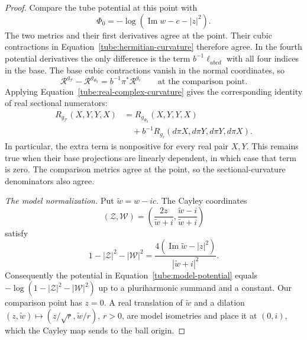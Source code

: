 \begin{proof}
Compare the tube potential at this point with
\begin{equation}\label{tube:model-potential}
 \Phi_0=-\log(\operatorname{Im}w-c-|z|^2).
\end{equation}
The two metrics and their first derivatives agree at the point.
Their cubic contractions in
Equation~\eqref{tube:hermitian-curvature} therefore agree.  In the
fourth potential derivatives the only difference is the term
$b^{-1}\ell_{a\bar b c\bar d}$ with all four indices in the base.
The base cubic contractions vanish in the normal coordinates, so
\begin{equation}\label{tube:hermitian-transfer}
 \mathcal R^{g_{\mathcal T}}-\mathcal R^{g_{\Phi_0}}
 =b^{-1}\pi^*\mathcal R^{g_\ell}
 \qquad\text{at the comparison point}.
\end{equation}
Applying Equation~\eqref{tube:real-complex-curvature} gives the
corresponding identity of real sectional numerators:
\begin{equation}\label{tube:real-transfer}
 \begin{split}
 R_{g_{\mathcal T}}(X,Y,Y,X)
 &=R_{g_{\Phi_0}}(X,Y,Y,X)\\
 &\quad+b^{-1}R_{g_\ell}(d\pi X,d\pi Y,d\pi Y,d\pi X).
 \end{split}
\end{equation}
In particular, the extra term is nonpositive for every real pair
$X,Y$.  This remains true when their base projections are linearly
dependent, in which case that term is zero.  The comparison metrics
agree at the point, so the sectional-curvature denominators also
agree.

\emph{The model normalization.}
Put $\widetilde w=w-ic$.  The Cayley coordinates
\[
 (\mathcal Z,\mathcal W)
 =\left(\frac{2z}{\widetilde w+i},
         \frac{\widetilde w-i}{\widetilde w+i}\right)
\]
satisfy
\[
 1-|\mathcal Z|^2-|\mathcal W|^2
 =\frac{4(\operatorname{Im}\widetilde w-|z|^2)}
        {|\widetilde w+i|^2}.
\]
Consequently the potential in Equation~\eqref{tube:model-potential}
equals $-\log(1-|\mathcal Z|^2-|\mathcal W|^2)$ up to a
pluriharmonic summand and a constant.  Our comparison point has
$z=0$.  A real translation of $\widetilde w$ and a dilation
$(z,\widetilde w)\mapsto(z/\sqrt r,\widetilde w/r)$, $r>0$, are
model isometries and place it at $(0,i)$, which the Cayley map sends
to the ball origin.


\end{proof}
